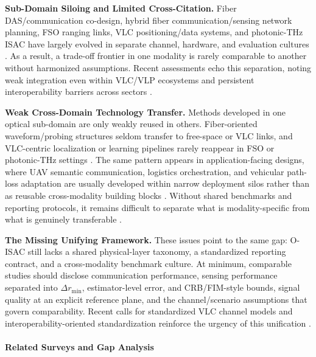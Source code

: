 \documentclass[letterpaper,journal]{IEEEtran}
\begin{document}
\textbf{Sub-Domain Siloing and Limited Cross-Citation.} Fiber DAS/communication co-design, hybrid fiber communication/sensing network planning, FSO ranging links, VLC positioning/data systems, and photonic-THz ISAC have largely evolved in separate channel, hardware, and evaluation cultures \cite{O_ISAC_033,O_ISAC_050,O_ISAC_082,O_ISAC_128}. As a result, a trade-off frontier in one modality is rarely comparable to another without harmonized assumptions. Recent assessments echo this separation, noting weak integration even within VLC/VLP ecosystems and persistent interoperability barriers across sectors \cite{O_ISAC_039,O_ISAC_161}.

\textbf{Weak Cross-Domain Technology Transfer.} Methods developed in one optical sub-domain are only weakly reused in others. Fiber-oriented waveform/probing structures seldom transfer to free-space or VLC links, and VLC-centric localization or learning pipelines rarely reappear in FSO or photonic-THz settings \cite{O_ISAC_042,O_ISAC_074,O_ISAC_022,O_ISAC_039}. The same pattern appears in application-facing designs, where UAV semantic communication, logistics orchestration, and vehicular path-loss adaptation are usually developed within narrow deployment silos rather than as reusable cross-modality building blocks \cite{O_ISAC_094,O_ISAC_155,O_ISAC_160}. Without shared benchmarks and reporting protocols, it remains difficult to separate what is modality-specific from what is genuinely transferable \cite{O_ISAC_068,O_ISAC_067}.

\textbf{The Missing Unifying Framework.} These issues point to the same gap: O-ISAC still lacks a shared physical-layer taxonomy, a standardized reporting contract, and a cross-modality benchmark culture. At minimum, comparable studies should disclose communication performance, sensing performance separated into $\Delta r_{\min}$, estimator-level error, and CRB/FIM-style bounds, signal quality at an explicit reference plane, and the channel/scenario assumptions that govern comparability. Recent calls for standardized VLC channel models and interoperability-oriented standardization reinforce the urgency of this unification \cite{O_ISAC_327,O_ISAC_068,O_ISAC_082}.

\paragraph{Related Surveys and Gap Analysis}
\end{document}
